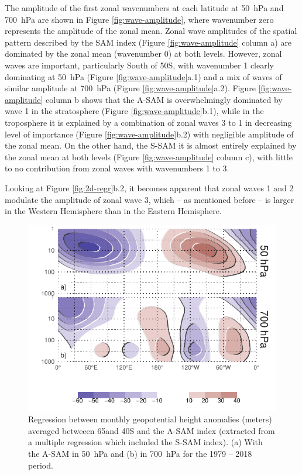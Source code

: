 \documentclass[smallextended]{svjour3}       %
\begin{document}
The amplitude of the first zonal wavenumbers at each latitude at 50~hPa and 700~hPa are shown in Figure \ref{fig:wave-amplitude}, where wavenumber zero represents the amplitude of the zonal mean. Zonal wave amplitudes of the spatial pattern described by the SAM index (Figure \ref{fig:wave-amplitude} column a) are dominated by the zonal mean (wavenumber 0) at both levels. However, zonal waves are important, particularly South of 50\degree S, with wavenumber 1 clearly dominating at 50~hPa (Figure \ref{fig:wave-amplitude}a.1) and a mix of waves of similar amplitude at 700~hPa (Figure \ref{fig:wave-amplitude}a.2). Figure \ref{fig:wave-amplitude} column b shows that the A\nobreakdash-SAM is overwhelmingly dominated by wave 1 in the stratosphere (Figure \ref{fig:wave-amplitude}b.1), while in the troposphere it is explained by a combination of zonal waves 3 to 1 in decreasing level of importance (Figure \ref{fig:wave-amplitude}b.2) with negligible amplitude of the zonal mean. On the other hand, the S\nobreakdash-SAM it is almost entirely explained by the zonal mean at both levels (Figure \ref{fig:wave-amplitude} column c), with little to no contribution from zonal waves with wavenumbers 1 to 3.

Looking at Figure \ref{fig:2d-regr}b.2, it becomes apparent that zonal waves 1 and 2 modulate the amplitude of zonal wave 3, which -- as mentioned before -- is larger in the Western Hemisphere than in the Eastern Hemisphere.

\begin{figure}
\includegraphics{vertical-regression-1} \caption{Regression between monthly geopotential height anomalies (meters) averaged betweeen 65\degree and 40\degree S and the A\nobreakdash-SAM index (extracted from a multiple regression which included the S\nobreakdash-SAM index). (a) With the A\nobreakdash-SAM in 50~hPa and (b) in 700~hPa for the 1979 -- 2018 period.}\label{fig:vertical-regression}
\end{figure}
\end{document}
